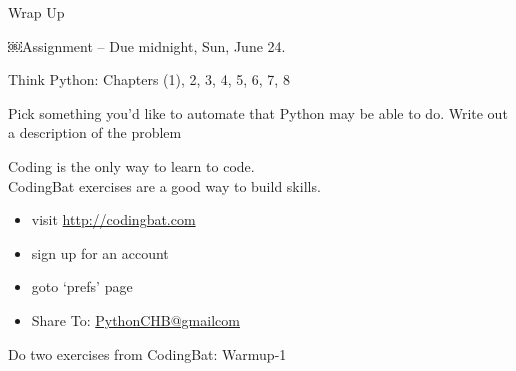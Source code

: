 \documentclass{beamer}
\begin{document}
\begin{frame}[fragile]{Wrap Up}

{\Large￼Assignment -- Due midnight, Sun, June 24.}

\vspace{0.15in}
Think Python: Chapters (1), 2, 3, 4, 5, 6, 7, 8

\vspace{0.15in}
Pick something you'd like to automate that Python may be able to do. Write out a description of the problem


\vspace{0.15in}
Coding is the only way to learn to code.\\
CodingBat exercises are a good way to build skills.
\begin{itemize}
  \item visit \url{http://codingbat.com}
  \item sign up for an account
  \item goto ‘prefs’ page
  \item Share To: \url{PythonCHB@gmailcom}
\end{itemize}

Do two exercises from CodingBat: Warmup-1 

\end{frame}
\end{document}
